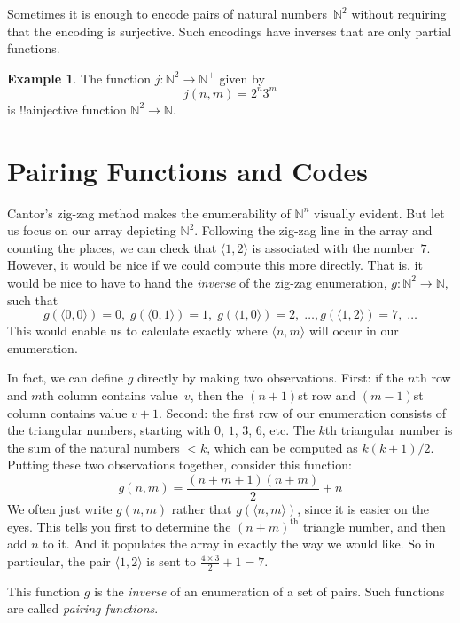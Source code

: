\documentclass[10pt,a4paper]{article}
\theoremstyle{plain}
\theoremstyle{definition}
\newtheorem{ex}[thm]{Example}
\theoremstyle{remark}
\newenvironment{explain}{}{}
\newcommand*{\olfileid}[3]{}
\newcommand*{\olsection}[1]{\section*{#1}}
\providecommand{\tuple}[1]{\langle #1 \rangle}
\providecommand{\Nat}{\ensuremath{\mathbb{N}}}
\begin{document}
Sometimes it is enough to encode pairs of natural numbers~$\Nat^2$
without requiring that the encoding is surjective. Such encodings have
inverses that are only partial functions. 

\begin{ex}
The function $j\colon \Nat^2 \to \Nat^+$ given by
\[
j(n,m) = 2^n3^m
\]
is !!a{injective} function $\Nat^2 \to \Nat$.
\end{ex}




\olfileid{sfr}{siz}{pai}
\olsection{Pairing Functions and Codes}

\begin{explain}
Cantor's zig-zag method makes the enumerability of $\Nat^n$ visually
evident. But let us focus on our array depicting $\Nat^2$. Following
the zig-zag line in the array and counting the places, we can check
that $\tuple{1,2}$ is associated with the number~$7$. However, it would
be nice if we could compute this more directly. That is, it would be
nice to have to hand the \emph{inverse} of the zig-zag enumeration,
$g\colon \Nat^2 \to \Nat$, such that
\[
g(\tuple{0,0}) = 0, \;
g(\tuple{0,1}) = 1, \;
g(\tuple{1,0}) = 2, \; \dots,  
g(\tuple{1,2}) = 7, \; \dots
\]
This would enable us to calculate exactly where $\tuple{n, m}$ will occur
in our enumeration. 

In fact, we can define $g$ directly by making two observations. First:
if the $n$th row and $m$th column contains value~$v$, then the
$(n+1)$st row and $(m-1)$st column contains value $v + 1$. Second: the
first row of our enumeration consists of the triangular numbers,
starting with $0$, $1$, $3$, $6$, etc. The $k$th triangular number is
the sum of the natural numbers $< k$, which can be computed as
$k(k+1)/2$. Putting these two observations together, consider this
function:
\[
  g(n,m) = \frac{(n+m+1)(n+m)}{2} + n
\]
We often just write $g(n, m)$ rather that $g(\tuple{n, m})$, since it
is easier on the eyes. This tells you first to determine the
$(n+m)^\text{th}$ triangle number, and then add $n$ to it. And
it populates the array in exactly the way we would like. So in
particular, the pair $\tuple{1, 2}$ is sent to $\frac{4 \times 3}{2} +
1 = 7$. 

This function $g$ is the \emph{inverse} of an enumeration of a set of
pairs. Such functions are called \emph{pairing functions}.
\end{explain}
\end{document}
